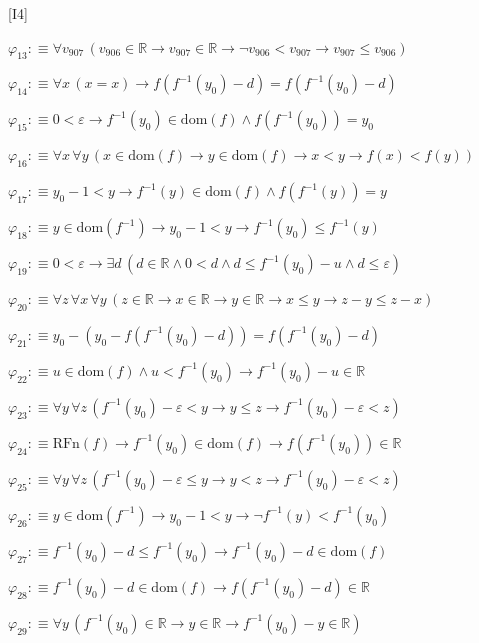 \begin{fullproof}{[I4]}
\begin{abbrevlist}
\item $\varphi_{13} :\equiv \forall v_{907}\,(v_{906} \in \mathbb{R} \to v_{907} \in \mathbb{R} \to \neg v_{906} < v_{907} \to v_{907} \leq v_{906})$
\item $\varphi_{14} :\equiv \forall x\,(x = x) \to f(f^{-1}(y_{0}) - d) = f(f^{-1}(y_{0}) - d)$
\item $\varphi_{15} :\equiv 0 < \varepsilon \to f^{-1}(y_{0}) \in \mathrm{dom}(f) \land f(f^{-1}(y_{0})) = y_{0}$
\item $\varphi_{16} :\equiv \forall x\,\forall y\,(x \in \mathrm{dom}(f) \to y \in \mathrm{dom}(f) \to x < y \to f(x) < f(y))$
\item $\varphi_{17} :\equiv y_{0} - 1 < y \to f^{-1}(y) \in \mathrm{dom}(f) \land f(f^{-1}(y)) = y$
\item $\varphi_{18} :\equiv y \in \mathrm{dom}(f^{-1}) \to y_{0} - 1 < y \to f^{-1}(y_{0}) \leq f^{-1}(y)$
\item $\varphi_{19} :\equiv 0 < \varepsilon \to \exists d\,(d \in \mathbb{R} \land 0 < d \land d \leq f^{-1}(y_{0}) - u \land d \leq \varepsilon)$
\item $\varphi_{20} :\equiv \forall z\,\forall x\,\forall y\,(z \in \mathbb{R} \to x \in \mathbb{R} \to y \in \mathbb{R} \to x \leq y \to z - y \leq z - x)$
\item $\varphi_{21} :\equiv y_{0} - (y_{0} - f(f^{-1}(y_{0}) - d)) = f(f^{-1}(y_{0}) - d)$
\item $\varphi_{22} :\equiv u \in \mathrm{dom}(f) \land u < f^{-1}(y_{0}) \to f^{-1}(y_{0}) - u \in \mathbb{R}$
\item $\varphi_{23} :\equiv \forall y\,\forall z\,(f^{-1}(y_{0}) - \varepsilon < y \to y \leq z \to f^{-1}(y_{0}) - \varepsilon < z)$
\item $\varphi_{24} :\equiv \mathrm{RFn}(f) \to f^{-1}(y_{0}) \in \mathrm{dom}(f) \to f(f^{-1}(y_{0})) \in \mathbb{R}$
\item $\varphi_{25} :\equiv \forall y\,\forall z\,(f^{-1}(y_{0}) - \varepsilon \leq y \to y < z \to f^{-1}(y_{0}) - \varepsilon < z)$
\item $\varphi_{26} :\equiv y \in \mathrm{dom}(f^{-1}) \to y_{0} - 1 < y \to \neg f^{-1}(y) < f^{-1}(y_{0})$
\item $\varphi_{27} :\equiv f^{-1}(y_{0}) - d \leq f^{-1}(y_{0}) \to f^{-1}(y_{0}) - d \in \mathrm{dom}(f)$
\item $\varphi_{28} :\equiv f^{-1}(y_{0}) - d \in \mathrm{dom}(f) \to f(f^{-1}(y_{0}) - d) \in \mathbb{R}$
\item $\varphi_{29} :\equiv \forall y\,(f^{-1}(y_{0}) \in \mathbb{R} \to y \in \mathbb{R} \to f^{-1}(y_{0}) - y \in \mathbb{R})$

\end{abbrevlist}
\end{fullproof}
